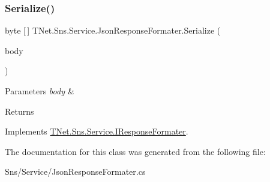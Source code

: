 \subsubsection{\texorpdfstring{Serialize()}{Serialize()}}
{\footnotesize\ttfamily byte \mbox{[}$\,$\mbox{]} T\+Net.\+Sns.\+Service.\+Json\+Response\+Formater.\+Serialize (\begin{DoxyParamCaption}\item[{\mbox{\hyperlink{class_t_net_1_1_sns_1_1_service_1_1_response_body}{Response\+Body}}}]{body }\end{DoxyParamCaption})}






\begin{DoxyParams}{Parameters}
{\em body} & \\
\hline
\end{DoxyParams}
\begin{DoxyReturn}{Returns}

\end{DoxyReturn}


Implements \mbox{\hyperlink{interface_t_net_1_1_sns_1_1_service_1_1_i_response_formater_ad44ce913b56224414b88e23c18195195}{T\+Net.\+Sns.\+Service.\+I\+Response\+Formater}}.



The documentation for this class was generated from the following file\+:\begin{DoxyCompactItemize}
\item 
Sns/\+Service/Json\+Response\+Formater.\+cs\end{DoxyCompactItemize}
